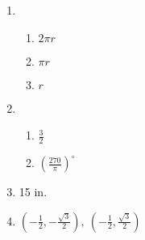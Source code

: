 \documentclass{article}
\begin{document}
\begin{enumerate}
\item

	\begin{enumerate}
	
	\item $2 \pi r$
	
	\item $\pi r$
	
	\item $r$
	
	\end{enumerate}
	
\item

	\begin{enumerate}
	
	\item $\frac{3}{2}$
	
	\item $\left( \frac{270}{\pi} \right)^ \circ$
	
	\end{enumerate}
	
\item 15 in.

\item $\left( -\frac{1}{2}, -\frac{\sqrt{3}}{2} \right), \ \left( -\frac{1}{2}, \frac{\sqrt{3}}{2} \right)$

\end{enumerate}
\end{document}
